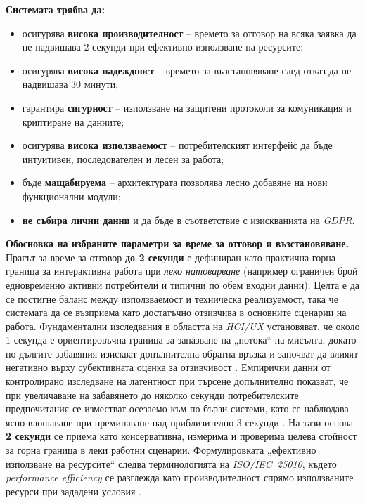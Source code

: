 \textbf{Системата трябва да:}
\begin{itemize}[itemsep=0.5em, topsep=0pt]
    \item осигурява \textbf{висока производителност} – времето за отговор на всяка заявка да не надвишава 2 секунди при ефективно използване на ресурсите;
    \item осигурява \textbf{висока надеждност} – времето за възстановяване след отказ да не надвишава 30 минути;
    \item гарантира \textbf{сигурност} – използване на защитени протоколи за комуникация и криптиране на данните;
    \item осигурява \textbf{висока използваемост} – потребителският интерфейс да бъде интуитивен, последователен и лесен за работа;
    \item бъде \textbf{мащабируема} – архитектурата позволява лесно добавяне на нови функционални модули;
    \item \textbf{не събира лични данни} и да бъде в съответствие с изискванията на \textit{GDPR}.
\end{itemize}
\vspace{0.4cm}
\textbf{Обосновка на избраните параметри за време за отговор и възстановяване.} \\
Прагът за време за отговор \textbf{до 2 секунди} е дефиниран като практична горна граница за интерактивна работа при \emph{леко натоварване} (например ограничен брой едновременно активни потребители и типични по обем входни данни). Целта е да се постигне баланс между използваемост и техническа реализуемост, така че системата да се възприема като достатъчно отзивчива в основните сценарии на работа. Фундаментални изследвания в областта на \textit{HCI/UX} установяват, че около 1 секунда е ориентировъчна граница за запазване на „потока“ на мисълта, докато по-дългите забавяния изискват допълнителна обратна връзка и започват да влияят негативно върху субективната оценка за отзивчивост \cite{Nielsen1993RT}. Емпирични данни от контролирано изследване на латентност при търсене допълнително показват, че при увеличаване на забавянето до няколко секунди потребителските предпочитания се изместват осезаемо към по-бързи системи, като се наблюдава ясно влошаване при преминаване над приблизително 3 секунди \cite{Brutlag2008Latency}. На тази основа \textbf{2 секунди} се приема като консервативна, измерима и проверима целева стойност за горна граница в леки работни сценарии. Формулировката „ефективно използване на ресурсите“ следва терминологията на \textit{ISO/IEC~25010}, където \textit{performance efficiency} се разглежда като производителност спрямо използваните ресурси при зададени условия \cite{ISOIEC25010_2011,Arc42ISO25010}.

